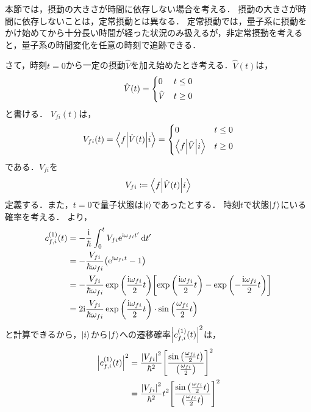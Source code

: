\documentclass{report}
\begin{document}
  本節では，摂動の大きさが時間に依存しない場合を考える．
  摂動の大きさが時間に依存しないことは，定常摂動とは異なる．
  定常摂動では，量子系に摂動をかけ始めてから十分長い時間が経った状況のみ扱えるが，非定常摂動を考えると，量子系の時間変化を任意の時刻で追跡できる．
  \par
  さて，時刻$t = 0$から一定の摂動$\hat{V}$を加え始めたとき考える．$\hat{V}(t)$は，
  \begin{align}
    \hat{V}(t) =
    \begin{dcases}
      0 & t \leq 0 \\
      \hat{V} & t \geq 0
    \end{dcases}
  \end{align}
  と書ける．
  $V_{fi}(t)$は，
  \begin{align}
    V_{fi}(t) = \mel**{f}{\hat{V}(t)}{i} =
    \begin{dcases}
      0 & t \leq 0 \\
      \mel**{f}{\hat{V}}{i} & t \geq 0
    \end{dcases}
  \end{align}
  である．$V_{fi}$を
  \begin{align}
    V_{fi} \coloneqq \mel**{f}{\hat{V}(t)}{i}
  \end{align}
  定義する．また，$t = 0$で量子状態は$\ket{i}$であったとする．
  時刻$t$で状態$\ket{f}$にいる確率を考える．
  より，
  \begin{align}
    c_{f, i}^{(1)}(t) &= -\frac{\mathrm{i}}{\hbar}\int_{0}^{t}V_{fi}\mathrm{e}^{\mathrm{i}\omega_{fi}t'}\dd{t'} \\
    &= -\frac{V_{fi}}{\hbar\omega_{fi}}\qty(\mathrm{e}^{\mathrm{i}\omega_{fi}t} - 1) \\ 
    &= -\frac{V_{fi}}{\hbar\omega_{fi}}\exp\qty(\frac{\mathrm{i}\omega_{fi}}{2}t)\qty[\exp\qty(\frac{\mathrm{i}\omega_{fi}}{2}t) - \exp\qty(-\frac{\mathrm{i}\omega_{fi}}{2}t)] \\ 
    &= 2\mathrm{i}\frac{V_{fi}}{\hbar\omega_{fi}}\exp\qty(\frac{\mathrm{i}\omega_{fi}}{2}t)\cdot\sin\qty(\frac{\omega_{fi}}{2}t)
  \end{align}
  と計算できるから，$\ket{i}$から$\ket{f}$への遷移確率$\abs{c_{f, i}^{(1)}(t)}^2$は，
  \begin{align}
    \abs{c_{f, i}^{(1)}(t)}^2 &= \frac{\abs{V_{fi}}^2}{\hbar^2}\qty[\frac{\sin\qty(\frac{\omega_{fi}}{2}t)}{\qty(\frac{\omega_{fi}}{2})}]^2 \\ 
    &= \frac{\abs{V_{fi}}^2}{\hbar^2}t^2\qty[\frac{\sin\qty(\frac{\omega_{fi}}{2}t)}{\qty(\frac{\omega_{fi}}{2}t)}]^2 \label{v-const-cfi-t}
  \end{align}
\end{document}
